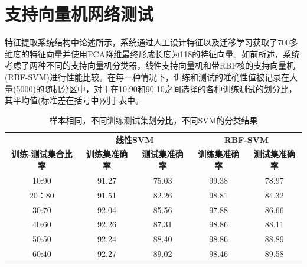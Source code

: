 \section{支持向量机网络测试}

特征提取系统结构中论述所示，系统通过人工设计特征以及迁移学习获取了700多维度的特征向量并使用PCA降维最终形成长度为118的特征向量。如前所述，系统考虑了两种不同的支持向量机分类器，线性支持向量机和带RBF核的支持向量机(RBF-SVM)进行性能比较。在每一种情况下，训练和测试的准确性值被记录在大量(5000)的随机分区中，对于在10:90和90:10之间选择的各种训练测试的划分比，其平均值(标准差在括号中)列于表中。

\begin{table}[h]
\caption{样本相同，不同训练测试集划分比，不同SVM的分类结果}
\begin{tabular}{c|cc|cc}
\hline
                                     & \multicolumn{2}{c|}{\textbf{线性SVM}}                         & \multicolumn{2}{c}{\textbf{RBF-SVM}}                                          \\ \cline{2-5} 
\multirow{-2}{*}{\textbf{训练-测试集合比率}} & \textbf{训练集准确率}              & \textbf{测试集准确率}              & \textbf{训练集准确率}                       & \textbf{测试集准确率}                       \\ \hline
{\color[HTML]{343434} 10:90}         & {\color[HTML]{333333} 91.27} & {\color[HTML]{333333} 75.03} & {\color[HTML]{333333} 99.38}          & {\color[HTML]{333333} 78.97}          \\
20：80                                & {\color[HTML]{333333} 91.51} & {\color[HTML]{333333} 82.26} & {\color[HTML]{333333} 98.81}          & {\color[HTML]{333333} 84.32}          \\
30:70                                & {\color[HTML]{333333} 92.04} & {\color[HTML]{333333} 85.56} & {\color[HTML]{333333} 97.88}          & {\color[HTML]{333333} 86.66}          \\
40:60                                & {\color[HTML]{333333} 92.26} & {\color[HTML]{333333} 87.31} & {\color[HTML]{333333} 98.86}          & {\color[HTML]{333333} 88.11}          \\
50:50                                & {\color[HTML]{333333} 92.24} & {\color[HTML]{333333} 88.40} & {\color[HTML]{333333} 98.86}          & {\color[HTML]{333333} 88.89}          \\
60:40                                & {\color[HTML]{333333} 92.27} & {\color[HTML]{333333} 89.02} & {\color[HTML]{333333} 98.46}          & {\color[HTML]{333333} 89.58}          \\

\end{tabular}
\end{table}
